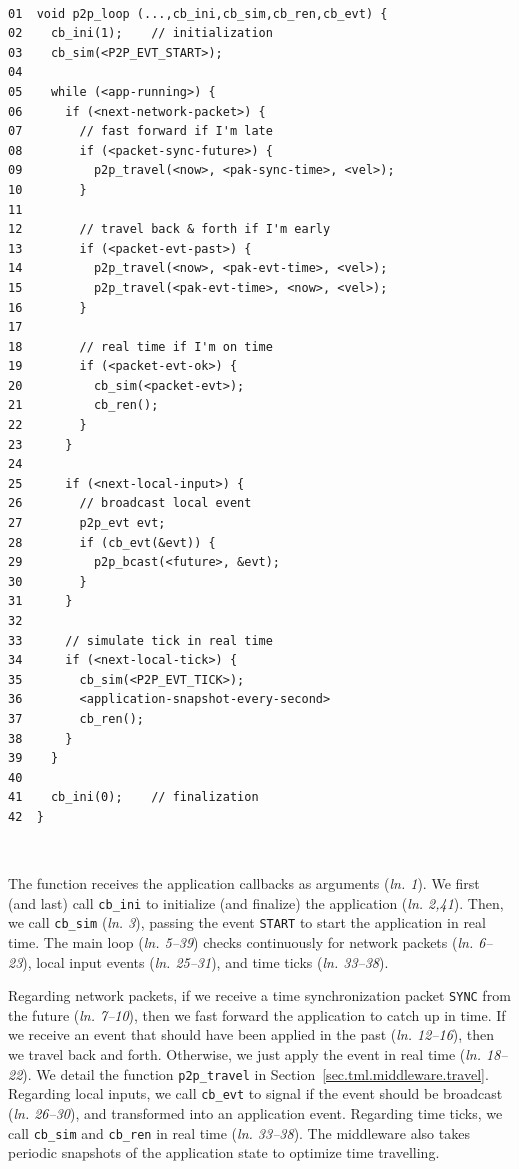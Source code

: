 \documentclass[10pt,journal,compsoc]{IEEEtran}
\newcommand{\code}[1]  {\texttt{\small{#1}}}
\newcommand{\lin}[1]{(\emph{ln. #1}\xspace)}
\begin{document}
{\footnotesize
~
\begin{verbatim}
01  void p2p_loop (...,cb_ini,cb_sim,cb_ren,cb_evt) {
02    cb_ini(1);    // initialization
03    cb_sim(<P2P_EVT_START>);
04
05    while (<app-running>) {
06      if (<next-network-packet>) {
07        // fast forward if I'm late
08        if (<packet-sync-future>) {
09          p2p_travel(<now>, <pak-sync-time>, <vel>);
10        }
11
12        // travel back & forth if I'm early
13        if (<packet-evt-past>) {
14          p2p_travel(<now>, <pak-evt-time>, <vel>);
15          p2p_travel(<pak-evt-time>, <now>, <vel>);
16        }
17
18        // real time if I'm on time
19        if (<packet-evt-ok>) {
20          cb_sim(<packet-evt>);
21          cb_ren();
22        }
23      }
24
25      if (<next-local-input>) {
26        // broadcast local event
27        p2p_evt evt;
28        if (cb_evt(&evt)) {
29          p2p_bcast(<future>, &evt);
30        }
31      }
32
33      // simulate tick in real time
34      if (<next-local-tick>) {
35        cb_sim(<P2P_EVT_TICK>);
36        <application-snapshot-every-second>
37        cb_ren();
38      }
39    }
40
41    cb_ini(0);    // finalization
42  }
\end{verbatim}
~
}

The function receives the application callbacks as arguments \lin{1}.
We first (and last) call \code{cb\_ini} to initialize (and finalize) the
application \lin{2,41}.
Then, we call \code{cb\_sim} \lin{3}, passing the event \code{START} to start
the application in real time.
The main loop \lin{5--39} checks continuously for network packets \lin{6--23},
local input events \lin{25--31}, and time ticks \lin{33--38}.

Regarding network packets, if we receive a time synchronization packet
\code{SYNC} from the future \lin{7--10}, then we fast forward the application
to catch up in time. %
If we receive an event that should have been applied in the past \lin{12--16},
then we travel back and forth. %
Otherwise, we just apply the event in real time \lin{18--22}.
We detail the function \code{p2p\_travel} in
Section~\ref{sec.tml.middleware.travel}.
%
Regarding local inputs, we call \code{cb\_evt} to signal if the event should be
broadcast \lin{26--30}, and transformed into an application event.
%
Regarding time ticks, we call \code{cb\_sim} and \code{cb\_ren} in real time
\lin{33--38}.
The middleware also takes periodic snapshots of the application state to
optimize time travelling. %
\end{document}
